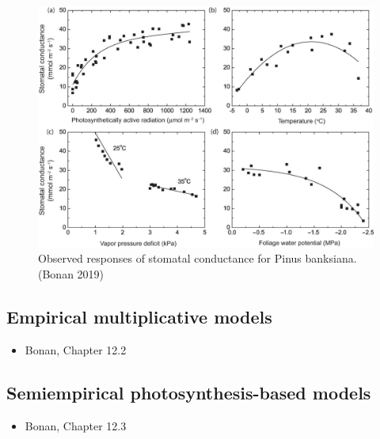 \documentclass[
  oneside]{book}
\providecommand{\tightlist}{%
  \setlength{\itemsep}{0pt}\setlength{\parskip}{0pt}}
\begin{document}
\begin{figure}

{\centering \includegraphics[width=0.8\linewidth]{figures/chap2/gs_obs} 

}

\caption{Observed responses of stomatal conductance for Pinus banksiana. (Bonan 2019)}\label{fig:f212}
\end{figure}

\hypertarget{empirical-multiplicative-models}{%
\subsection{Empirical multiplicative models}\label{empirical-multiplicative-models}}

\begin{itemize}
\tightlist
\item
  Bonan, Chapter 12.2
\end{itemize}

\hypertarget{semiempirical-photosynthesis-based-models}{%
\subsection{Semiempirical photosynthesis-based models}\label{semiempirical-photosynthesis-based-models}}

\begin{itemize}
\tightlist
\item
  Bonan, Chapter 12.3
\end{itemize}
\end{document}
